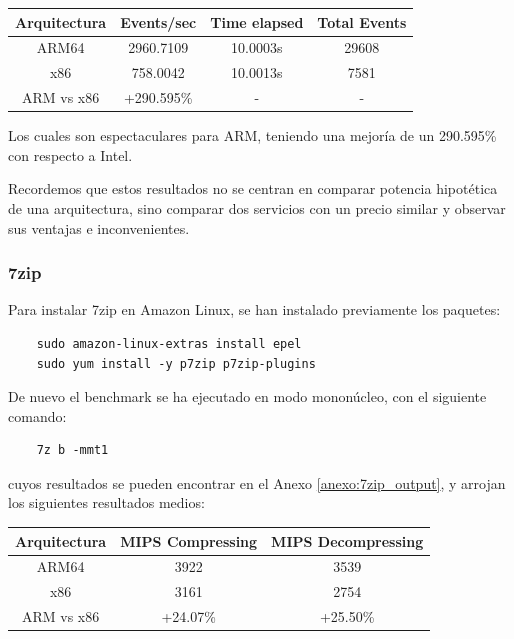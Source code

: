 \documentclass[a4paper,openright,12pt]{article}
\begin{document}
\begin{center}
\begin{tabular}{ | c | c | c | c | }
    \hline
    Arquitectura           &   Events/sec  &   Time elapsed &   Total Events    \\
    \hline
    ARM64                  &   2960.7109   &   10.0003s     &   29608           \\
    \hline
    x86                    &   758.0042    &   10.0013s     &   7581            \\
    \hline
    \hline
    ARM vs x86             &   +290.595\%  &   -     &   -    \\
    \hline
\end{tabular}
\end{center}

Los cuales son espectaculares para ARM, teniendo una mejoría de un 290.595\% con respecto a Intel.

Recordemos que estos resultados no se centran en comparar potencia hipotética de una arquitectura, sino comparar dos servicios con un precio similar y observar sus ventajas e inconvenientes.


\subsubsection{7zip}
Para instalar 7zip en Amazon Linux, se han instalado previamente los paquetes:
\begin{verbatim}
    sudo amazon-linux-extras install epel
    sudo yum install -y p7zip p7zip-plugins
\end{verbatim}

De nuevo el benchmark se ha ejecutado en modo mononúcleo, con el siguiente comando:
\begin{verbatim}
    7z b -mmt1
\end{verbatim}
cuyos resultados se pueden encontrar en el Anexo \ref{anexo:7zip_output}, y arrojan los siguientes resultados medios:

\begin{center}
\begin{tabular}{ | c | c | c | }
    \hline
    Arquitectura           &   MIPS Compressing  &  MIPS Decompressing  \\
    \hline
    ARM64                  &   3922              &   3539               \\
    \hline
    x86                    &   3161              &   2754               \\
    \hline
    \hline
    ARM vs x86             &   +24.07\%          &   +25.50\%           \\
    \hline
\end{tabular}
\end{center}
\end{document}
